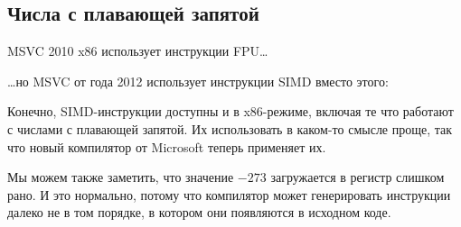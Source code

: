 \subsection{Числа с плавающей запятой}



MSVC 2010 x86 использует инструкции \ac{FPU}\dots



\dots но MSVC от года 2012 использует инструкции \ac{SIMD} вместо этого:



Конечно, \ac{SIMD}-инструкции доступны и в x86-режиме, включая те что работают
с числами с плавающей запятой.
Их использовать в каком-то смысле проще, так что новый компилятор от Microsoft теперь применяет их.

Мы можем также заметить, что значение $-273$ загружается в регистр  слишком рано.
И это нормально, потому что компилятор может генерировать инструкции далеко не в том порядке, в котором
они появляются в исходном коде.
